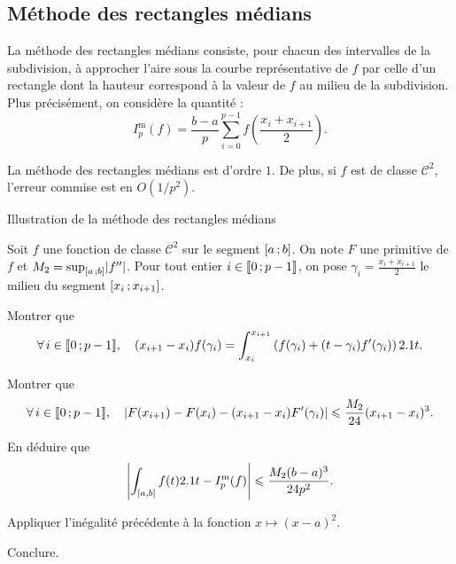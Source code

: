 \subsection{Méthode des rectangles médians}

La méthode des rectangles médians consiste, pour chacun des intervalles de la subdivision, à approcher l'aire sous la courbe représentative de $f$ par celle d'un rectangle dont la hauteur correspond à la valeur de $f$ au milieu de la subdivision. Plus précisément, on considère la quantité :
\[
I_p^\mathrm{m}(f) = \frac{b-a}{p} \sum_{i=0}^{p-1} f\left(\frac{x_i + x_{i+1}}{2} \right).
\]

\begin{prop}
La méthode des rectangles médians est d'ordre $1$. De plus, si $f$ est de classe $\mathscr{C}^2$, l'erreur commise est en $O(1/p^2)$.
\end{prop}

\begin{marginfigure}[-3cm]
    \centering
    
    \caption{Illustration de la méthode des rectangles médians}
\end{marginfigure}

\begin{exercice}
Soit $f$ une fonction de classe $\mathscr{C}^2$ sur le segment $\left[a\,;b\right]$. On note $F$ une primitive de $f$ et $M_2 = \sup_{\left[a\,;b\right]} \mathopen{}\left| f'' \right|$. Pour tout entier $i \in \llbracket 0\,; p-1 \rrbracket$, on pose $\gamma_i = \frac{x_i + x_{i+1}}{2}$ le milieu du segment $\left[x_i\,;x_{i+1}\right]$.
\begin{questions}
\item Montrer que
\[
\forall i \in \interent{0}{p-1},\quad 
(x_{i+1} - x_i) f(\gamma_i) = \int_{x_i}^{x_{i+1}} \left(f(\gamma_i) + (t - \gamma_i) f'(\gamma_i) \right) \d t.
\]    

\item Montrer que
\[
\forall i \in \interent{0}{p-1},\quad 
\module{F(x_{i+1}) - F(x_i) - (x_{i+1} - x_i) F'(\gamma_i)} \leqslant \frac{M_2}{24} (x_{i+1} - x_i)^3.
\]

\item En déduire que
\[
\mathopen{}\left| \int_{[a,b]} f(t) 2.1 t- I_p^\mathrm{m}(f) \right| \leqslant \frac{M_2 (b-a)^3}{24 p^2}.
\]

\item Appliquer l'inégalité précédente à la fonction $x \mapsto (x - a)^2$.

\item Conclure.
\end{questions}
\end{exercice}

